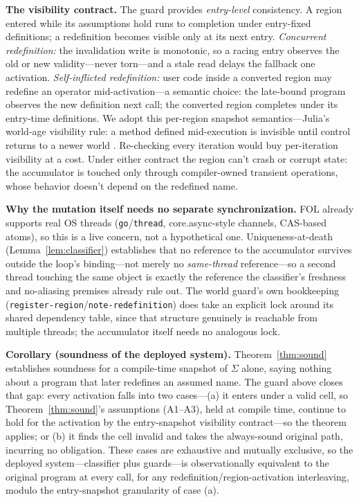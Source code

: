 \documentclass[sigplan,review,anonymous]{acmart}
\begin{document}
\textbf{The visibility contract.} The guard provides \emph{entry-level} consistency. A region entered while its assumptions hold runs to completion under entry-fixed definitions; a redefinition becomes visible only at its next entry. \emph{Concurrent redefinition:} the invalidation write is monotonic, so a racing entry observes the old or new validity---never torn---and a stale read delays the fallback one activation. \emph{Self-inflicted redefinition:} user code inside a converted region may redefine an operator mid-activation---a semantic choice: the late-bound program observes the new definition next call; the converted region completes under its entry-time definitions. We adopt this per-region snapshot semantics---Julia's world-age visibility rule: a method defined mid-execution is invisible until control returns to a newer world \cite{belyakova2020jit}. Re-checking every iteration would buy per-iteration visibility at a cost. Under either contract the region can't crash or corrupt state: the accumulator is touched only through compiler-owned transient operations, whose behavior doesn't depend on the redefined name.

\textbf{Why the mutation itself needs no separate synchronization.} FOL already supports real OS threads (\texttt{go}/\texttt{thread}, core.async-style channels, CAS-based atoms), so this is a live concern, not a hypothetical one. Uniqueness-at-death (Lemma~\ref{lem:classifier}) establishes that no reference to the accumulator survives outside the loop's binding---not merely no \emph{same-thread} reference---so a second thread touching the same object is exactly the reference the classifier's freshness and no-aliasing premises already rule out. The world guard's own bookkeeping (\texttt{register-region}/\texttt{note-redefinition}) does take an explicit lock around its shared dependency table, since that structure genuinely is reachable from multiple threads; the accumulator itself needs no analogous lock.

\textbf{Corollary (soundness of the deployed system).} Theorem~\ref{thm:sound} establishes soundness for a compile-time snapshot of $\Sigma$ alone, saying nothing about a program that later redefines an assumed name. The guard above closes that gap: every activation falls into two cases---(a) it enters under a valid cell, so Theorem~\ref{thm:sound}'s assumptions (A1--A3), held at compile time, continue to hold for the activation by the entry-snapshot visibility contract---so the theorem applies; or (b) it finds the cell invalid and takes the always-sound original path, incurring no obligation. These cases are exhaustive and mutually exclusive, so the deployed system---classifier plus guards---is observationally equivalent to the original program at every call, for any redefinition/region-activation interleaving, modulo the entry-snapshot granularity of case (a).
\end{document}
